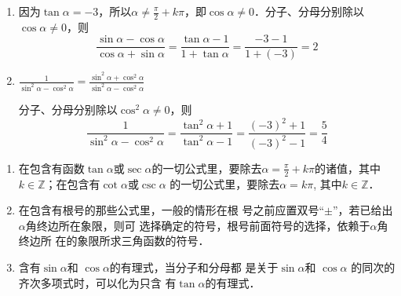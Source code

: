 \begin{solution}
\begin{enumerate}
    \item 因为$\tan\alpha=-3$，所以$\alpha\ne \frac{\pi}{2}+k\pi$，即$\cos\alpha\ne 0$．分子、分母分别除以$\cos\alpha\ne 0$，则
\[\frac{\sin\alpha-\cos\alpha}{\cos\alpha+\sin\alpha}=\frac{\tan\alpha-1}{1+\tan\alpha}=\frac{-3-1}{1+(-3)}=2\]    

\item $\frac{1}{\sin^2\alpha-\cos^2\alpha}=\frac{\sin^2\alpha+\cos^2\alpha}{\sin^2\alpha-\cos^2\alpha}$

分子、分母分别除以$\cos^2\alpha\ne 0$，则
\[\frac{1}{\sin^2\alpha-\cos^2\alpha}=\frac{\tan^2\alpha+1}{\tan^2\alpha-1}=\frac{(-3)^2+1}{(-3)^2-1}=\frac{5}{4}\]
\end{enumerate}  
\end{solution}



\begin{rmk}
\begin{enumerate}
    \item 在包含有函数$\tan\alpha$或$\sec\alpha$的一切公式里，要除去$\alpha=\frac{\pi}{2}+k\pi$的诸值，其中$k\in\mathbb{Z}$；在包含有$\cot\alpha$或$\csc\alpha$
    的一切公式里，要除去$\alpha=k\pi$, 其中$k\in\mathbb{Z}$．
    \item 在包含有根号的那些公式里，一般的情形在根
    号之前应置双号“$\pm$”，若已给出$\alpha$角终边所在象限，则可
    选择确定的符号，根号前面符号的选择，依赖于$\alpha$角终边所
    在的象限所求三角函数的符号．
    \item 含有$\sin\alpha$和
    $\cos\alpha$的有理式，当分子和分母都
    是关于$\sin\alpha$和
    $\cos\alpha$
    的同次的齐次多项式时，可以化为只含
    有$\tan\alpha$的有理式．
\end{enumerate} 
\end{rmk}


